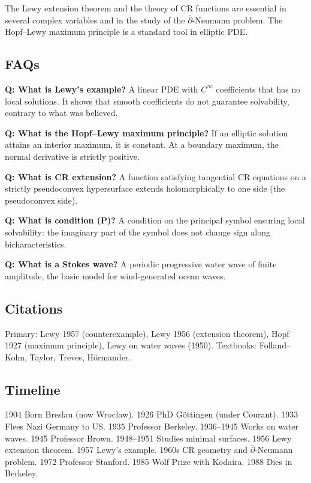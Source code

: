 The Lewy extension theorem and the theory of CR functions are essential in several complex variables and in the study of the $\overline{\partial}$-Neumann problem. The Hopf--Lewy maximum principle is a standard tool in elliptic PDE.

\subsection*{FAQs}

\noindent\textbf{Q: What is Lewy's example?} A linear PDE with $C^\infty$ coefficients that has no local solutions. It shows that smooth coefficients do not guarantee solvability, contrary to what was believed.

\noindent\textbf{Q: What is the Hopf--Lewy maximum principle?} If an elliptic solution attains an interior maximum, it is constant. At a boundary maximum, the normal derivative is strictly positive.

\noindent\textbf{Q: What is CR extension?} A function satisfying tangential CR equations on a strictly pseudoconvex hypersurface extends holomorphically to one side (the pseudoconvex side).

\noindent\textbf{Q: What is condition (P)?} A condition on the principal symbol ensuring local solvability: the imaginary part of the symbol does not change sign along bicharacteristics.

\noindent\textbf{Q: What is a Stokes wave?} A periodic progressive water wave of finite amplitude, the basic model for wind-generated ocean waves.

\subsection*{Citations}

Primary: Lewy 1957 (counterexample), Lewy 1956 (extension theorem), Hopf 1927 (maximum principle), Lewy on water waves (1950). Textbooks: Folland--Kohn, Taylor, Treves, H\"{o}rmander.

\subsection*{Timeline}

1904 Born Breslau (now Wroc\l aw). 1926 PhD G\"{o}ttingen (under Courant). 1933 Flees Nazi Germany to US. 1935 Professor Berkeley. 1936--1945 Works on water waves. 1945 Professor Brown. 1948--1951 Studies minimal surfaces. 1956 Lewy extension theorem. 1957 Lewy's example. 1960s CR geometry and $\overline{\partial}$-Neumann problem. 1972 Professor Stanford. 1985 Wolf Prize with Kodaira. 1988 Dies in Berkeley.

